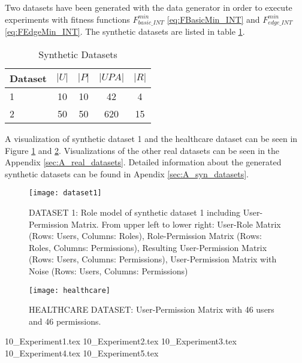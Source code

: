 Two datasets have been generated with the data generator in order to execute experiments with fitness functions $F_{basic\_INT}^{min}$ \eqref{eq:FBasicMin_INT} and $F_{edge\_INT}^{min}$ \eqref{eq:FEdgeMin_INT}. The synthetic datasets are listed in table \ref{tab:syntheticDatasets}.

\begin{table}[H]
    \centering
    \begin{tabular}{|l|c|c|c|c|}
        \hline
        \rowcolor{myGray} 
        \textbf{Dataset} & \textbf{$|U|$} & \textbf{$|P|$} & \textbf{$|UPA|$} & \textbf{$|R|$}\\ \hline
        1       & 10    & 10   & 42    & 4\\ \hline
        2       & 50    & 50   & 620   & 15\\ \hline
    \end{tabular}
    \caption{Synthetic Datasets}
    \label{tab:syntheticDatasets}
\end{table}

A visualization of synthetic dataset 1 and the healthcare dataset can be seen in Figure \ref{fig:dataset1} and \ref{fig:healthcare}. Visualizations of the other real datasets can be seen in the Appendix \ref{sec:A_real_datasets}. Detailed information about the generated synthetic datasets can be found in Apendix \ref{sec:A_syn_datasets}.

\begin{figure}[H]
    \centering
    \texttt{[image: dataset1]}
    \caption{DATASET 1: Role model of synthetic dataset 1 including User-Permission Matrix. From upper left to lower right: User-Role Matrix (Rows: Users, Columns: Roles), Role-Permission Matrix (Rows: Roles, Columns: Permissions), Resulting User-Permission Matrix (Rows: Users, Columns: Permissions), User-Permission Matrix with Noise (Rows: Users, Columns: Permissions)}
    \label{fig:dataset1}
\end{figure}

\begin{figure}[H]
    \centering
    \texttt{[image: healthcare]}
    \caption{HEALTHCARE DATASET: User-Permission Matrix with 46 users and 46 permissions.}
    \label{fig:healthcare}
\end{figure}

{10_Experiment1.tex}
{10_Experiment2.tex}
{10_Experiment3.tex}
{10_Experiment4.tex}
{10_Experiment5.tex}

